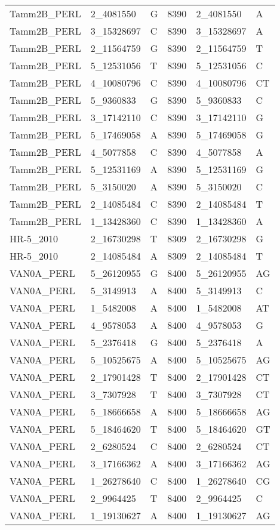 \begin{center}
\begin{longtable}{|l|l|l|l|l|l|}
Tamm2B\_PERL&2\_4081550&G&8390&2\_4081550&A\\
Tamm2B\_PERL&3\_15328697&C&8390&3\_15328697&A\\
Tamm2B\_PERL&2\_11564759&G&8390&2\_11564759&T\\
Tamm2B\_PERL&5\_12531056&T&8390&5\_12531056&C\\
Tamm2B\_PERL&4\_10080796&C&8390&4\_10080796&CT\\
Tamm2B\_PERL&5\_9360833&G&8390&5\_9360833&C\\
Tamm2B\_PERL&3\_17142110&C&8390&3\_17142110&G\\
Tamm2B\_PERL&5\_17469058&A&8390&5\_17469058&G\\
Tamm2B\_PERL&4\_5077858&C&8390&4\_5077858&A\\
Tamm2B\_PERL&5\_12531169&A&8390&5\_12531169&G\\
Tamm2B\_PERL&5\_3150020&A&8390&5\_3150020&C\\
Tamm2B\_PERL&2\_14085484&C&8390&2\_14085484&T\\
Tamm2B\_PERL&1\_13428360&C&8390&1\_13428360&A\\
HR-5\_2010&2\_16730298&T&8309&2\_16730298&G\\
HR-5\_2010&2\_14085484&A&8309&2\_14085484&T\\
VAN0A\_PERL&5\_26120955&G&8400&5\_26120955&AG\\
VAN0A\_PERL&5\_3149913&A&8400&5\_3149913&C\\
VAN0A\_PERL&1\_5482008&A&8400&1\_5482008&AT\\
VAN0A\_PERL&4\_9578053&A&8400&4\_9578053&G\\
VAN0A\_PERL&5\_2376418&G&8400&5\_2376418&A\\
VAN0A\_PERL&5\_10525675&A&8400&5\_10525675&AG\\
VAN0A\_PERL&2\_17901428&T&8400&2\_17901428&CT\\
VAN0A\_PERL&3\_7307928&T&8400&3\_7307928&CT\\
VAN0A\_PERL&5\_18666658&A&8400&5\_18666658&AG\\
VAN0A\_PERL&5\_18464620&T&8400&5\_18464620&GT\\
VAN0A\_PERL&2\_6280524&C&8400&2\_6280524&CT\\
VAN0A\_PERL&3\_17166362&A&8400&3\_17166362&AG\\
VAN0A\_PERL&1\_26278640&C&8400&1\_26278640&CG\\
VAN0A\_PERL&2\_9964425&T&8400&2\_9964425&C\\
VAN0A\_PERL&1\_19130627&A&8400&1\_19130627&AG\\

\end{longtable}
\end{center}
